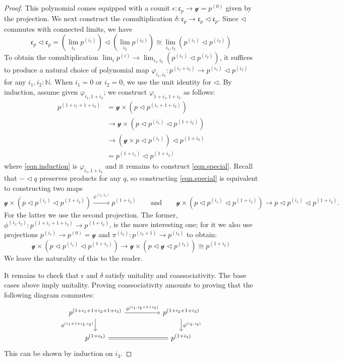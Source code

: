 \documentclass[11pt, one side, article]{memoir}
\theoremstyle{definition}
\theoremstyle{plain}
\newcommand{\To}[2][]{\xrightarrow[#1]{#2}}
\newcommand{\nn}{\mathbb{N}}
\newcommand{\yon}{\mathcal{y}}
\newcommand{\tri}{\mathbin{\triangleleft}}
\newcommand{\cofree}{\mathfrak{c}}
\newcommand{\qqand}{\qquad\text{and}\qquad}
\newcommand{\coh}[1]{^{(#1)}}
\begin{document}
\begin{proof}
This polynomial comes equipped with a counit $\epsilon\colon\cofree_p\to\yon=p\coh{0}$ given by the projection. We next construct the comultiplication $\delta\colon\cofree_p\to\cofree_p\tri\cofree_p$. Since $\tri$ commutes with connected limits, we have
\[
  \cofree_p\tri\cofree_p=
  \left(\lim_{i_1}p\coh{i_1}\right)\tri\left(\lim_{i_2}p\coh{i_2}\right)\cong
  \lim_{i_1,i_2}\left(p\coh{i_1}\tri p\coh{i_2}\right)
\]
To obtain the comultiplication $\lim_ip\coh{i}\to\lim_{i_1,i_2}(p\coh{i_1}\tri p\coh{i_2})$, it suffices to produce a natural choice of polynomial map $\varphi_{i_1,i_2}\colon p\coh{i_1+i_2}\to p\coh{i_1}\tri p\coh{i_2}$ for any $i_1,i_2:\nn$. When $i_1=0$ or $i_2=0$, we use the unit identity for $\tri$. By induction, assume given $\varphi_{i_1,1+i_2}$; we construct $\varphi_{1+i_1,1+i_2}$ as follows:
\begin{align}
\nonumber
  p\coh{1+i_1+1+i_2}&=
  \yon\times \left(p\tri p\coh{i_1+1+i_2}\right)\\&\to
\label{eqn.induction}
  \yon\times \left(p\tri p\coh{i_1}\tri p\coh{1+i_2}\right)\\&\to
\label{eqn.special}
  \left(\yon\times p\tri p\coh{i_1}\right)\tri p\coh{1+i_2}\\&=
\nonumber
  p\coh{1+i_1}\tri p\coh{1+i_2}
\end{align}
where \eqref{eqn.induction} is $\varphi_{i_1,1+i_2}$ and it remains to construct \eqref{eqn.special}. Recall that $-\tri q$ preserves products for any $q$, so constructing \eqref{eqn.special} is equivalent to constructing two maps
\[
\yon\times \left(p\tri p\coh{i_1}\tri p\coh{1+i_2}\right)\To{\phi\coh{i_1,i_2}} p\coh{1+i_2}
\qqand
\yon\times \left(p\tri p\coh{i_1}\tri p\coh{1+i_2}\right)\to p\tri p\coh{i_1}\tri p\coh{1+i_2}.
\]
For the latter we use the second projection. The former, $\phi\coh{i_1,i_2}\colon p\coh{1+i_1+1+i_2}\to p\coh{1+i_2}$, is the more interesting one; for it we also use projections $p\coh{i_1}\to p\coh{0}=\yon$ and $\pi\coh{i_2}\colon p\coh{i_2+1}\to p\coh{i_2}$ to obtain:
\[
\yon\times \left(p\tri p\coh{i_1}\tri p\coh{1+i_2}\right)\to
\yon\times \left(p\tri\yon\tri p\coh{i_2}\right)\cong p\coh{1+i_2}
\]
We leave the naturality of this to the reader.

It remains to check that $\epsilon$ and $\delta$ satisfy unitality and coassociativity. The base cases above imply unitality. Proving coassociativity amounts to proving that the following diagram commutes:
\[
\begin{tikzcd}[column sep=50pt]
	p\coh{1+i_1+1+i_2+1+i_3}\ar[r, "\phi\coh{i_1,i_2+1+i_3}"]\ar[d, "\phi\coh{i_1+1+i_2,i_3}"']&
	p\coh{1+i_2+1+i_3}\ar[d, "\phi\coh{i_2,i_3}"]\\
	p\coh{1+i_3}\ar[r,equal]&p\coh{1+i_3}
\end{tikzcd}
\]
This can be shown by induction on $i_3$.
\end{proof}
\end{document}
